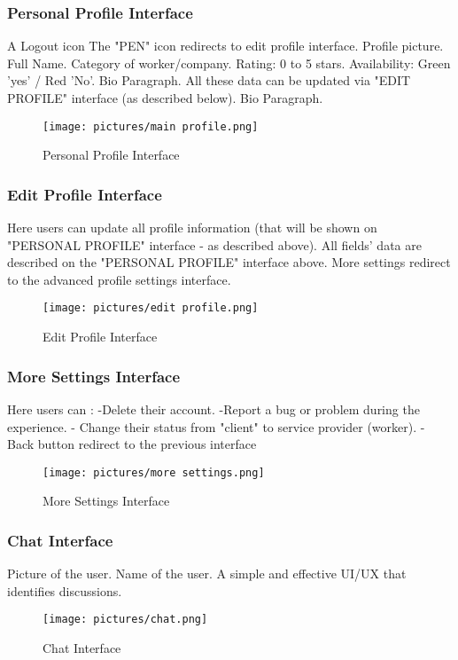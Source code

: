 \documentclass[12pt]{report}
\begin{document}
\subsubsection{Personal Profile Interface}
A Logout icon
The "PEN" icon redirects to edit profile interface.
Profile picture.
Full Name.
Category of worker/company.
Rating: 0 to 5 stars.
Availability: Green 'yes' / Red 'No'.
Bio Paragraph.
All these data can be updated via "EDIT PROFILE" interface (as described below). 
Bio Paragraph.
\begin{figure}[!htbp]

        \centering
    \texttt{[image: pictures/main profile.png]}
    \caption{Personal Profile Interface}
    \label{fig:personal_profile}
\end{figure}
\pagebreak
\subsubsection{Edit Profile Interface}
Here users can update all profile information (that will be shown on "PERSONAL PROFILE" interface - as described above).
All fields' data are described on the   "PERSONAL PROFILE" interface above.   
More settings redirect to the advanced profile settings interface.
\begin{figure}[!htbp]

        \centering
    \texttt{[image: pictures/edit profile.png]}
    \caption{Edit Profile Interface}
    \label{fig:edit_profile}
\end{figure}
\pagebreak
\subsubsection{More Settings Interface}
Here users can : 
-Delete their account.
-Report a bug or problem during the experience.
- Change their status from "client" to service provider (worker).
- Back button redirect to the previous interface
\begin{figure}[!htbp]

        \centering
    \texttt{[image: pictures/more settings.png]}
    \caption{More Settings Interface}
    \label{fig:more_settings_interface}
\end{figure}
\pagebreak
\subsubsection{Chat Interface}
Picture of the user.
Name of the user.
A simple and effective UI/UX that identifies discussions.
\begin{figure}[!htbp]

        \centering
    \texttt{[image: pictures/chat.png]}
    \caption{Chat Interface}
    \label{fig:chat_interface}
\end{figure}
\pagebreak
\end{document}
